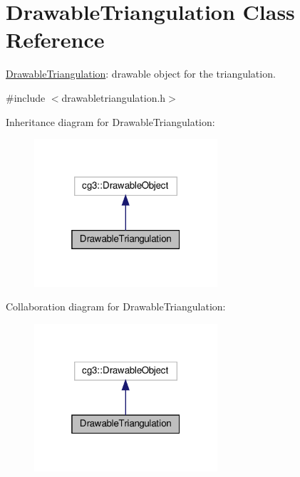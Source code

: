\hypertarget{classDrawableTriangulation}{}\section{Drawable\+Triangulation Class Reference}
\label{classDrawableTriangulation}


\hyperlink{classDrawableTriangulation}{Drawable\+Triangulation}\+: drawable object for the triangulation.  




{\ttfamily \#include $<$drawabletriangulation.\+h$>$}



Inheritance diagram for Drawable\+Triangulation\+:
\nopagebreak
\begin{figure}[H]
\begin{center}
\leavevmode
\includegraphics[width=193pt]{classDrawableTriangulation__inherit__graph}
\end{center}
\end{figure}


Collaboration diagram for Drawable\+Triangulation\+:
\nopagebreak
\begin{figure}[H]
\begin{center}
\leavevmode
\includegraphics[width=193pt]{classDrawableTriangulation__coll__graph}
\end{center}
\end{figure}
